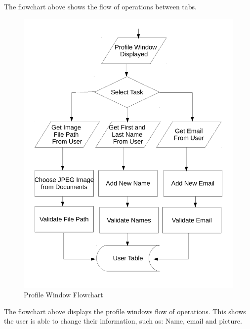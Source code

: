 The flowchart above shows the flow of operations between tabs.

\begin{figure}[H]
    \includegraphics[width=\textwidth]{./Design/ProfileFlowchart.pdf}
    \caption{Profile Window Flowchart} \label{fig:Profile Flowchart}
\end{figure}

The flowchart above displays the profile windows flow of operations. This shows the user is able to change their information, such as: Name, email and picture.


